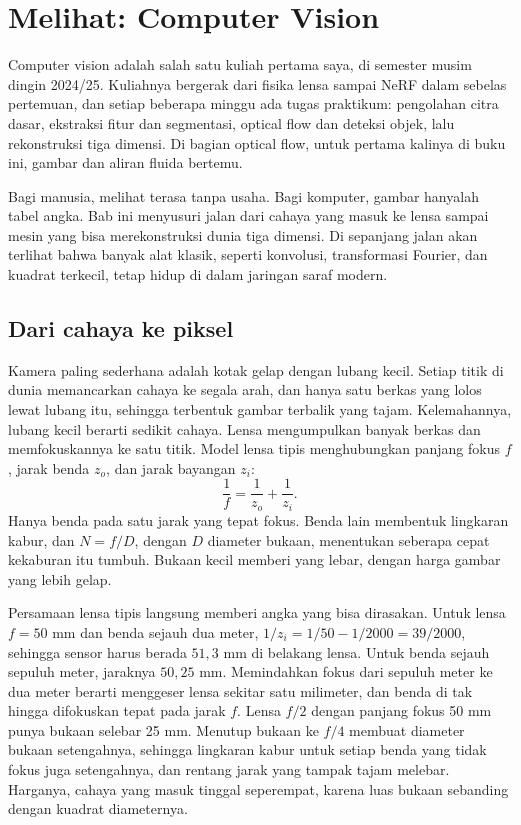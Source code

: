 \chapter{Melihat: Computer Vision}
\label{ch:cv}

Computer vision adalah salah satu kuliah pertama saya, di semester musim dingin 2024/25.
Kuliahnya bergerak dari fisika lensa sampai NeRF dalam sebelas pertemuan, dan setiap beberapa
minggu ada tugas praktikum: pengolahan citra dasar, ekstraksi fitur dan segmentasi, optical flow
dan deteksi objek, lalu rekonstruksi tiga dimensi. Di bagian optical flow, untuk pertama kalinya
di buku ini, gambar dan aliran fluida bertemu.

Bagi manusia, melihat terasa tanpa usaha. Bagi komputer, gambar hanyalah tabel angka. Bab ini
menyusuri jalan dari cahaya yang masuk ke lensa sampai mesin yang bisa merekonstruksi dunia tiga
dimensi. Di sepanjang jalan akan terlihat bahwa banyak alat klasik, seperti konvolusi,
transformasi Fourier, dan kuadrat terkecil, tetap hidup di dalam jaringan saraf modern.

\section{Dari cahaya ke piksel}

Kamera paling sederhana adalah kotak gelap dengan lubang kecil. Setiap titik di dunia
memancarkan cahaya ke segala arah, dan hanya satu berkas yang lolos lewat lubang itu, sehingga
terbentuk gambar terbalik yang tajam. Kelemahannya, lubang kecil berarti sedikit cahaya. Lensa
mengumpulkan banyak berkas dan memfokuskannya ke satu titik. Model lensa tipis menghubungkan
panjang fokus $f$, jarak benda $z_o$, dan jarak bayangan $z_i$:
\begin{equation}
\frac1f=\frac1{z_o}+\frac1{z_i}.
\end{equation}
Hanya benda pada satu jarak yang tepat fokus. Benda lain membentuk lingkaran kabur, dan
 $N=f/D$, dengan $D$ diameter bukaan, menentukan seberapa cepat kekaburan itu
tumbuh. Bukaan kecil memberi  yang lebar, dengan harga gambar yang lebih gelap.

Persamaan lensa tipis langsung memberi angka yang bisa dirasakan. Untuk lensa $f=50$ mm dan benda sejauh dua meter,
$1/z_i=1/50-1/2000=39/2000$, sehingga sensor harus berada $51{,}3$ mm di belakang lensa. Untuk benda sejauh sepuluh meter,
jaraknya $50{,}25$ mm. Memindahkan fokus dari sepuluh meter ke dua meter berarti menggeser lensa sekitar satu milimeter, dan
benda di tak hingga difokuskan tepat pada jarak $f$. Lensa $f/2$ dengan panjang fokus 50 mm punya bukaan selebar 25 mm.
Menutup bukaan ke $f/4$ membuat diameter bukaan setengahnya, sehingga lingkaran kabur untuk setiap benda yang tidak fokus juga
setengahnya, dan rentang jarak yang tampak tajam melebar. Harganya, cahaya yang masuk tinggal seperempat, karena luas bukaan
sebanding dengan kuadrat diameternya.

